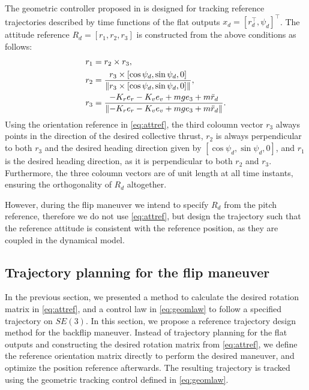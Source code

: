 The geometric controller proposed in \cite{turpinkumar2011} is designed for tracking reference trajectories described by time functions of the flat outputs $x_d=[r_d^\top, \psi_d]^\top$. The attitude reference $R_d=[r_1, r_2, r_3]$ is constructed from the above conditions as follows:
\begin{subequations}\label{eq:attref}
\begin{align}
    r_1 &= r_2\times r_3,\\
    r_2 &= \frac{r_3\times [\cos\psi_d, \sin\psi_d, 0]}{\norm{r_3\times [\cos\psi_d, \sin\psi_d, 0]}},\\
    r_3 &= \frac{-K_r e_r - K_v e_v + m g e_3+m \ddot r_d}{\norm{-K_r e_r - K_v e_v + m g e_3+m \ddot r_d}}.
\end{align}
\end{subequations}
Using the orientation reference in \eqref{eq:attref}, the third coloumn vector $r_3$ always points in the direction of the desired collective thrust, $r_2$ is always perpendicular to both $r_3$ and the desired heading direction given by $[\cos\psi_d, \sin\psi_d, 0]$, and $r_1$ is the desired heading direction, as it is perpendicular to both $r_2$ and $r_3$. Furthermore, the three coloumn vectors are of unit length at all time instants, ensuring the orthogonality of $R_d$ altogether.


However, during the flip maneuver we intend to specify $R_d$ from the pitch reference, therefore we do not use \eqref{eq:attref}, but design the trajectory such that the reference attitude is consistent with the reference position, as they are coupled in the dynamical model.  


\subsection{Trajectory planning for the flip maneuver}
In the previous section, we presented a method to calculate the desired rotation matrix in \eqref{eq:attref}, and a control law in \eqref{eq:geomlaw} to follow a specified trajectory on $SE(3)$. In this section, we propose a reference trajectory design method for the backflip maneuver. Instead of trajectory planning for the flat outputs and constructing the desired rotation matrix from \eqref{eq:attref}, we define the reference orientation matrix directly to perform the desired maneuver, and optimize the position reference afterwards. The resulting trajectory is tracked using the geometric tracking control defined in \eqref{eq:geomlaw}.


